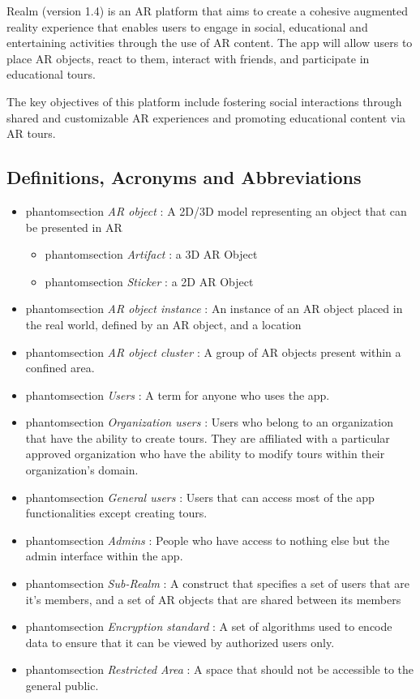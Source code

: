 \documentclass{article}
\makeatletter
\newcommand{\labeltext}[3][]{%
    \@bsphack%
    \csname phantomsection\endcsname%
    \def\tst{#1}%
    \def\labelmarkup{\emph}%
    \def\refmarkup{}%
    \ifx\tst\empty\def\@currentlabel{\refmarkup{#2}}{\label{#3}}%
    \else\def\@currentlabel{\refmarkup{#1}}{\label{#3}}\fi%
    \@esphack%
    \labelmarkup{#2}%
}
\makeatother
\begin{document}
Realm (version 1.4) is an AR platform that aims to create a cohesive augmented reality experience that enables users to engage in social, educational and entertaining activities through the use of AR content. The app will allow users to place AR objects, react to them, interact with friends, and participate in educational tours.

The key objectives of this platform include fostering social interactions through shared and customizable AR experiences and promoting educational content via AR tours.

\subsection{Definitions, Acronyms and Abbreviations}
\label{sub:def_acr_abb}

\begin{itemize}
    \item \labeltext{AR object}{def:ar_obj}: A 2D/3D model representing an object that can be presented in AR
          \begin{itemize}
              \item \labeltext{Artifact}{def:artifact}: a 3D AR Object
              \item \labeltext{Sticker}{def:sticker}: a 2D AR Object
          \end{itemize}
    \item \labeltext{AR object instance}{def:ar_obj_instance}: An instance of an AR object placed in the real world, defined by an AR object, and a location
    \item \labeltext{AR object cluster}{def:ar_obj_cls}: A group of AR objects present within a confined area.
    \item \labeltext{Users}{def:user}: A term for anyone who uses the app.
    \item \labeltext{Organization users}{def:org_user}: Users who belong to an organization that have the ability to create tours. They are affiliated with a particular approved organization who have the ability to modify tours within their organization’s domain.
    \item \labeltext{General users}{def:gen_user}: Users that can access most of the app functionalities except creating tours.
    \item \labeltext{Admins}{def:admin}: People who have access to nothing else but the admin interface within the app.
    \item \labeltext{Sub-Realm}{def:sub_realm}: A construct that specifies a set of users that are it’s members, and a set of AR objects that are shared between its members
    \item \labeltext{Encryption standard}{def:encryption_standard}: A set of algorithms used to encode data to ensure that it can be viewed by authorized users only.
    \item \labeltext{Restricted Area}{def:restricted_area}: A space that should not be accessible to the general public.
\end{itemize}
\end{document}
